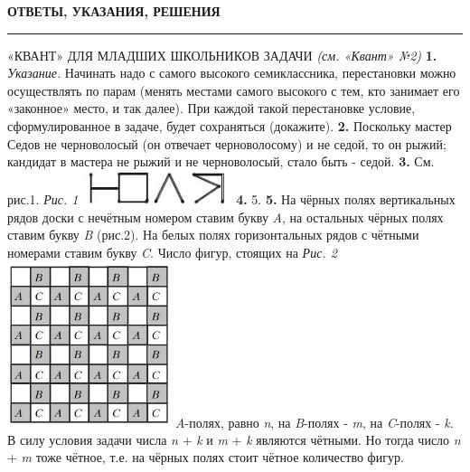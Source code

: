 \documentclass[10pt, a4paper, twoside]{article}
\begin{document}
\begin{center}
 {\large\bf ОТВЕТЫ, УКАЗАНИЯ, РЕШЕНИЯ} 
\medskip\hrule height 1pt
\end{center}

\begin{multicols*}{2}
\noindent «КВАНТ» ДЛЯ МЛАДШИХ ШКОЛЬНИКОВ\newline
\noindent ЗАДАЧИ\newline
\textit{(см. «Квант» №2)}\newline
\textbf{1. }\textit{Указание. } Начинать надо с самого высокого семиклассника, перестановки можно осуществлять по парам (менять местами самого высокого с тем, кто занимает его  «законное» место, и так далее). При каждой такой перестановке условие, сформулированное в задаче, будет сохраняться (докажите).\newline
\textbf{2. }Поскольку мастер Седов не черноволосый (он отвечает черноволосому) и не седой, то он рыжий; кандидат в мастера не рыжий и не черноволосый, стало быть - седой.\newline
\textbf{3. }См. рис.1.\newline
\newline
\textit{Рис. 1}\includegraphics[width=45mm,scale=0.5]{1}\newline
\textbf{4. }5.\newline
\textbf{5. }На чёрных полях вертикальных рядов доски с нечётным номером ставим букву \textit{A}, на остальных чёрных полях ставим букву \textit{B} (рис.2). На белых полях горизонтальных рядов с чётными номерами ставим букву \textit{C}. Число фигур, стоящих на\newline
\textit{Рис. 2}\includegraphics[width=48mm,scale=0.5]{2}\newline
\textit{A}-полях, равно \textit{n}, на \textit{B}-полях - \textit{m}, на \textit{C}-полях - \textit{k}. В силу условия задачи числа \textit{n} + \textit{k} и \textit{m} + \textit{k} являются чётными. Но тогда число \textit{n} + \textit{m} тоже чётное, т.е. на чёрных полях стоит чётное количество фигур.\newline


\end{multicols*}
\end{document}
